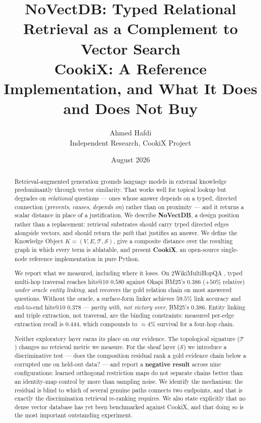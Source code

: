 \documentclass[11pt]{article}
\title{NoVectDB: Typed Relational Retrieval as a Complement to Vector Search\\
\large CookiX: A Reference Implementation, and What It Does and Does Not Buy}
\author{Ahmed Hafdi\\Independent Research, CookiX Project}
\date{August 2026}
\theoremstyle{definition}
\begin{document}
\maketitle

\begin{abstract}
Retrieval-augmented generation grounds language models in external knowledge
predominantly through vector similarity. That works well for topical lookup but
degrades on \emph{relational} questions --- ones whose answer depends on a typed,
directed connection (\emph{prevents}, \emph{causes}, \emph{depends on}) rather than on
proximity --- and it returns a scalar distance in place of a justification. We
describe \textbf{NoVectDB}, a design position rather than a replacement: retrieval
substrates should carry typed directed edges alongside vectors, and should return the
\emph{path} that justifies an answer. We define the Knowledge Object
$K=(V,E,\mathcal{T},\mathcal{S})$, give a composite distance over the resulting graph
in which every term is ablatable, and present \textbf{CookiX}, an open-source
single-node reference implementation in pure Python.

We report what we measured, including where it loses. On 2WikiMultiHopQA
\cite{ho2020constructing}, typed multi-hop traversal reaches hits@10 $0.580$ against
Okapi BM25's \cite{robertson2009probabilistic} $0.386$ ($+50\%$ relative)
\emph{under oracle entity linking}, and recovers the gold relation chain on most
answered questions. Without the oracle, a surface-form linker achieves $59.5\%$ link
accuracy and end-to-end hits@10 $0.378$ --- \emph{parity with, not victory over},
BM25's $0.386$. Entity linking and triple extraction, not traversal, are the binding
constraints: measured per-edge extraction recall is $0.444$, which compounds to
$\approx4\%$ survival for a four-hop chain.

Neither exploratory layer earns its place on our evidence. The topological signature
($\mathcal{T}$) changes no retrieval metric we measure. For the sheaf layer
($\mathcal{S}$) we introduce a discriminative test --- does the composition residual
rank a gold evidence chain below a corrupted one on held-out data? --- and report a
\textbf{negative result} across nine configurations: learned orthogonal restriction
maps do not separate chains better than an identity-map control by more than sampling
noise. We identify the mechanism: the residual is blind to which of several genuine
paths connects two endpoints, and that is exactly the discrimination retrieval
re-ranking requires. We also state explicitly that no dense vector database has yet
been benchmarked against CookiX, and that doing so is the most important outstanding
experiment.
\end{abstract}
\end{document}

